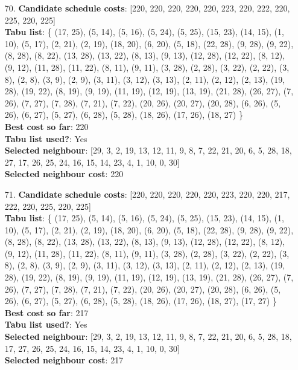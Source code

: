 \documentclass[fleqn]{article}
\begin{document}
\begin{itemize}
    \item[70.] \textbf{Candidate schedule costs}: [220, 220, 220, 220, 220, 223, 220, 222, 220, 225, 220, 225] \\
    \textbf{Tabu list}: \{ (17, 25), (5, 14), (5, 16), (5, 24), (5, 25), (15, 23), (14, 15), (1, 10), (5, 17), (2, 21), (2, 19), (18, 20), (6, 20), (5, 18), (22, 28), (9, 28), (9, 22), (8, 28), (8, 22), (13, 28), (13, 22), (8, 13), (9, 13), (12, 28), (12, 22), (8, 12), (9, 12), (11, 28), (11, 22), (8, 11), (9, 11), (3, 28), (2, 28), (3, 22), (2, 22), (3, 8), (2, 8), (3, 9), (2, 9), (3, 11), (3, 12), (3, 13), (2, 11), (2, 12), (2, 13), (19, 28), (19, 22), (8, 19), (9, 19), (11, 19), (12, 19), (13, 19), (21, 28), (26, 27), (7, 26), (7, 27), (7, 28), (7, 21), (7, 22), (20, 26), (20, 27), (20, 28), (6, 26), (5, 26), (6, 27), (5, 27), (6, 28), (5, 28), (18, 26), (17, 26), (18, 27) \} \\
    \textbf{Best cost so far}: 220 \\
    \textbf{Tabu list used?}: Yes \\
    \textbf{Selected neighbour}: [29, 3, 2, 19, 13, 12, 11, 9, 8, 7, 22, 21, 20, 6, 5, 28, 18, 27, 17, 26, 25, 24, 16, 15, 14, 23, 4, 1, 10, 0, 30] \\
    \textbf{Selected neighbour cost}: 220
      

    \item[71.] \textbf{Candidate schedule costs}: [220, 220, 220, 220, 220, 223, 220, 220, 217, 222, 220, 225, 220, 225] \\
    \textbf{Tabu list}: \{ (17, 25), (5, 14), (5, 16), (5, 24), (5, 25), (15, 23), (14, 15), (1, 10), (5, 17), (2, 21), (2, 19), (18, 20), (6, 20), (5, 18), (22, 28), (9, 28), (9, 22), (8, 28), (8, 22), (13, 28), (13, 22), (8, 13), (9, 13), (12, 28), (12, 22), (8, 12), (9, 12), (11, 28), (11, 22), (8, 11), (9, 11), (3, 28), (2, 28), (3, 22), (2, 22), (3, 8), (2, 8), (3, 9), (2, 9), (3, 11), (3, 12), (3, 13), (2, 11), (2, 12), (2, 13), (19, 28), (19, 22), (8, 19), (9, 19), (11, 19), (12, 19), (13, 19), (21, 28), (26, 27), (7, 26), (7, 27), (7, 28), (7, 21), (7, 22), (20, 26), (20, 27), (20, 28), (6, 26), (5, 26), (6, 27), (5, 27), (6, 28), (5, 28), (18, 26), (17, 26), (18, 27), (17, 27) \} \\
    \textbf{Best cost so far}: 217 \\
    \textbf{Tabu list used?}: Yes \\
    \textbf{Selected neighbour}: [29, 3, 2, 19, 13, 12, 11, 9, 8, 7, 22, 21, 20, 6, 5, 28, 18, 17, 27, 26, 25, 24, 16, 15, 14, 23, 4, 1, 10, 0, 30] \\
    \textbf{Selected neighbour cost}: 217
      


\end{itemize}
\end{document}
